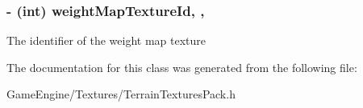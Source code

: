 \subsubsection[{\texorpdfstring{weight\+Map\+Texture\+Id}{weightMapTextureId}}]{\setlength{\rightskip}{0pt plus 5cm}-\/ (int) weight\+Map\+Texture\+Id\hspace{0.3cm}{\ttfamily [read]}, {\ttfamily [write]}, {\ttfamily [atomic]}}\hypertarget{interface_terrain_textures_pack_aaff06a2e112ae5f534b3bdd4804e7659}{}\label{interface_terrain_textures_pack_aaff06a2e112ae5f534b3bdd4804e7659}
The identifier of the weight map texture 

The documentation for this class was generated from the following file\+:\begin{DoxyCompactItemize}
\item 
Game\+Engine/\+Textures/Terrain\+Textures\+Pack.\+h\end{DoxyCompactItemize}
